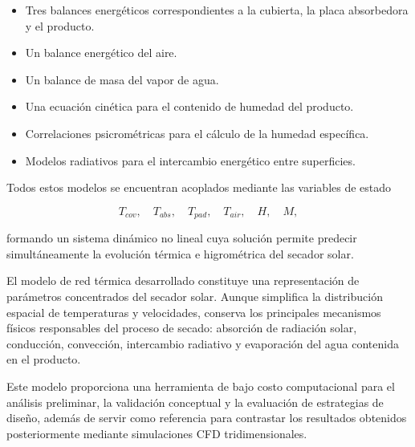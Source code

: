 \begin{itemize}

\item Tres balances energéticos correspondientes a la cubierta, la placa absorbedora y el producto.

\item Un balance energético del aire.

\item Un balance de masa del vapor de agua.

\item Una ecuación cinética para el contenido de humedad del producto.

\item Correlaciones psicrométricas para el cálculo de la humedad específica.

\item Modelos radiativos para el intercambio energético entre superficies.

\end{itemize}

Todos estos modelos se encuentran acoplados mediante las variables de estado

\[
T_{cov},
\quad
T_{abs},
\quad
T_{pad},
\quad
T_{air},
\quad
H,
\quad
M,
\]

formando un sistema dinámico no lineal cuya solución permite predecir simultáneamente la evolución térmica e higrométrica del secador solar.

\begin{tcolorbox}[title=Conclusión del modelo,colback=blue!4,colframe=blue!70!black]

El modelo de red térmica desarrollado constituye una representación de parámetros concentrados del secador solar. Aunque simplifica la distribución espacial de temperaturas y velocidades, conserva los principales mecanismos físicos responsables del proceso de secado: absorción de radiación solar, conducción, convección, intercambio radiativo y evaporación del agua contenida en el producto.

Este modelo proporciona una herramienta de bajo costo computacional para el análisis preliminar, la validación conceptual y la evaluación de estrategias de diseño, además de servir como referencia para contrastar los resultados obtenidos posteriormente mediante simulaciones CFD tridimensionales.

\end{tcolorbox}



